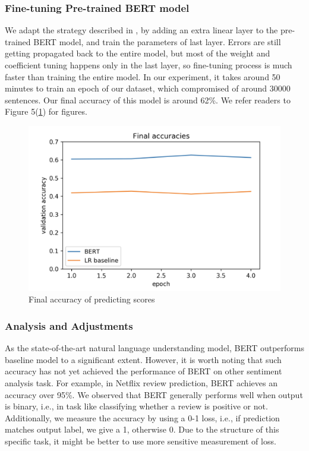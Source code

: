 \documentclass{article}
\begin{document}
\subsubsection{Fine-tuning Pre-trained BERT model}
We adapt the strategy described in \cite{2}, by adding an extra linear layer
to the pre-trained BERT model, and train the
parameters of last layer. Errors are still getting propagated back to the entire model,
but most of the weight and coefficient tuning happens only in the last layer, so fine-tuning process is
much faster than training the entire model. In our experiment, it takes around
50 minutes to train an epoch of our dataset, which compromised of around
30000 sentences. Our final accuracy of this model is around 62\%. We refer 
readers to Figure 5(\ref{fig5}) for figures.
\begin{figure}
\label{fig5}
\begin{center}
\includegraphics[scale=0.6]{final_acc}
\caption{Final accuracy of predicting scores}
\end{center}
\end{figure}

\subsubsection{Analysis and Adjustments}
As the state-of-the-art natural language understanding model, BERT 
outperforms baseline model to a significant extent. However, it is worth 
noting that such accuracy has not yet achieved the performance of BERT on
other sentiment analysis task. For example, in Netflix review prediction, 
BERT achieves an accuracy over 95\%. We observed that BERT generally performs well when output is binary, i.e., in task like 
classifying whether a review is positive or not. Additionally, we measure the
accuracy by using a 0-1 loss, i.e., if prediction matches output label, we give
a 1, otherwise 0. Due to the structure of this specific task, it might be 
better to use more sensitive measurement of loss.\\
\end{document}
